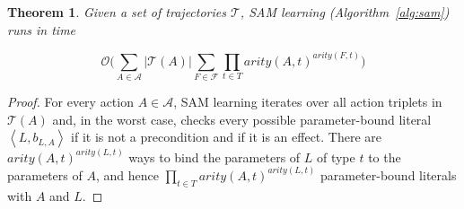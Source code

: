 \documentclass{article}
\newtheorem{theorem}{Theorem}
\newcommand{\tuple}[1]{\ensuremath{\left \langle #1 \right \rangle }}
\newcommand{\liftf}{F}
\newcommand{\liftl}{L}
\newcommand{\lifta}{A}
\begin{document}


\begin{theorem}
Given a set of trajectories $\mathcal{T}$, SAM learning (Algorithm~\ref{alg:sam}) runs in time 
\begin{small}
\[\mathcal{O}\Big(\sum_{\lifta\in \mathcal{A}}|\mathcal{T}(\lifta)|\sum_{\liftf\in\mathcal{F}}\prod_{t\in T}arity(\lifta,t)^{arity(\liftf,t)}\Big)\]
\end{small}
\end{theorem}
\begin{proof}
For every action $\lifta\in\mathcal{A}$, SAM learning iterates over all action triplets in $\mathcal{T}(\lifta)$ 
and, in the worst case, checks every possible parameter-bound literal $\tuple{\liftl, b_{\liftl,\lifta}}$ if it is not a precondition and if it is an effect. 
There are $arity(\lifta, t)^{arity(\liftl, t)}$ ways to bind the parameters of $\liftl$ of type $t$ to the parameters of $\lifta$, and hence $\prod_{t\in T}arity(\lifta, t)^{arity(
\liftl, t)}$ parameter-bound literals with $\lifta$ and $\liftl$. 
\end{proof}
\end{document}
